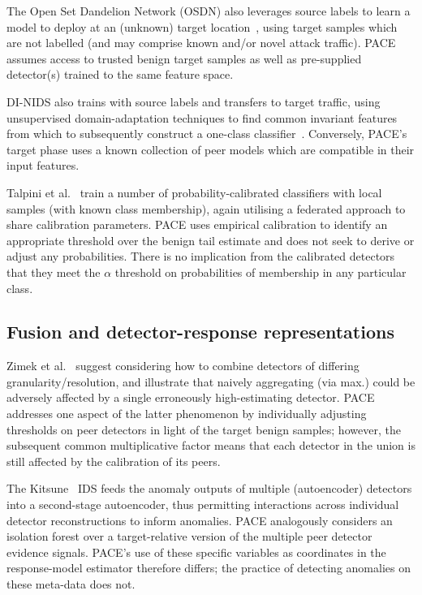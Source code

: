 The Open Set Dandelion Network (OSDN) also leverages source labels to learn a model to deploy at an (unknown) target location~\cite{osdn2024}, using target samples which are not labelled (and may comprise known and/or novel attack traffic). PACE assumes access to trusted benign target samples as well as pre-supplied detector(s) trained to the same feature space.

DI-NIDS also trains with source labels and transfers to target traffic, using unsupervised domain-adaptation techniques to find common invariant features from which to subsequently construct a one-class classifier~\cite{layeghy2023dinids}. Conversely, PACE's target phase uses a known collection of peer models which are compatible in their input features.

Talpini et al.~\cite{talpini2025} train a number of probability-calibrated classifiers with local samples (with known class membership), again utilising a federated approach to share calibration parameters. PACE uses empirical calibration to identify an appropriate threshold over the benign tail estimate and does not seek to derive or adjust any probabilities. There is no implication from the calibrated detectors that they meet the $\alpha$ threshold on probabilities of membership in any particular class.

\subsection{Fusion and detector-response representations} 
Zimek et al.~\cite{zimek2014} suggest considering how to combine detectors of differing granularity/resolution, and illustrate that naively aggregating (via max.) could be adversely affected by a single erroneously high-estimating detector. PACE addresses one aspect of the latter phenomenon by individually adjusting thresholds on peer detectors in light of the target benign samples; however, the subsequent common multiplicative factor means that each detector in the union is still affected by the calibration of its peers.

The Kitsune~\cite{kitsune2018} IDS feeds the anomaly outputs of multiple (autoencoder) detectors into a second-stage autoencoder, thus permitting interactions across individual detector reconstructions to inform anomalies. PACE analogously considers an isolation forest over a target-relative version of the multiple peer detector evidence signals. PACE's use of these specific variables as coordinates in the response-model estimator therefore differs; the practice of detecting anomalies on these meta-data does not.

